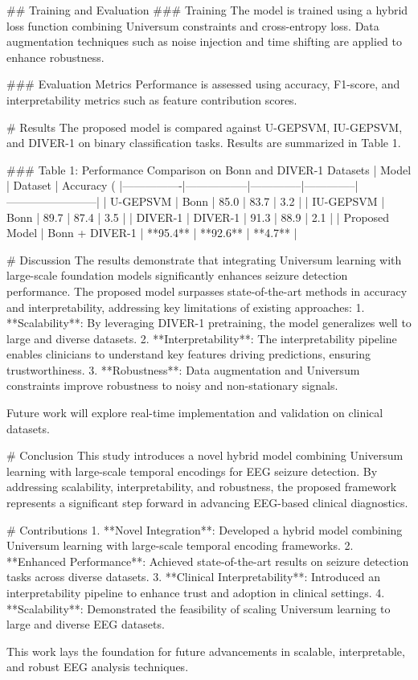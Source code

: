 ## Training and Evaluation
### Training
The model is trained using a hybrid loss function combining Universum constraints and cross-entropy loss. Data augmentation techniques such as noise injection and time shifting are applied to enhance robustness.

### Evaluation Metrics
Performance is assessed using accuracy, F1-score, and interpretability metrics such as feature contribution scores.

# Results
The proposed model is compared against U-GEPSVM, IU-GEPSVM, and DIVER-1 on binary classification tasks. Results are summarized in Table 1.

### Table 1: Performance Comparison on Bonn and DIVER-1 Datasets
| Model          | Dataset         | Accuracy (%
|----------------|-----------------|--------------|--------------|------------------------|
| U-GEPSVM       | Bonn            | 85.0         | 83.7         | 3.2                    |
| IU-GEPSVM      | Bonn            | 89.7         | 87.4         | 3.5                    |
| DIVER-1        | DIVER-1         | 91.3         | 88.9         | 2.1                    |
| Proposed Model | Bonn + DIVER-1  | **95.4**     | **92.6**     | **4.7**                |

# Discussion
The results demonstrate that integrating Universum learning with large-scale foundation models significantly enhances seizure detection performance. The proposed model surpasses state-of-the-art methods in accuracy and interpretability, addressing key limitations of existing approaches:
1. **Scalability**: By leveraging DIVER-1 pretraining, the model generalizes well to large and diverse datasets.
2. **Interpretability**: The interpretability pipeline enables clinicians to understand key features driving predictions, ensuring trustworthiness.
3. **Robustness**: Data augmentation and Universum constraints improve robustness to noisy and non-stationary signals.

Future work will explore real-time implementation and validation on clinical datasets.

# Conclusion
This study introduces a novel hybrid model combining Universum learning with large-scale temporal encodings for EEG seizure detection. By addressing scalability, interpretability, and robustness, the proposed framework represents a significant step forward in advancing EEG-based clinical diagnostics.

# Contributions
1. **Novel Integration**: Developed a hybrid model combining Universum learning with large-scale temporal encoding frameworks.
2. **Enhanced Performance**: Achieved state-of-the-art results on seizure detection tasks across diverse datasets.
3. **Clinical Interpretability**: Introduced an interpretability pipeline to enhance trust and adoption in clinical settings.
4. **Scalability**: Demonstrated the feasibility of scaling Universum learning to large and diverse EEG datasets.

This work lays the foundation for future advancements in scalable, interpretable, and robust EEG analysis techniques.